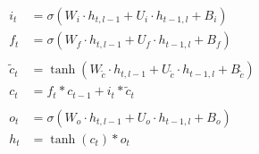 \documentclass{article}
\begin{document}
\begin{preview}

\begin{align*}
    i_t &= \sigma(W_i \cdot h_{t,l-1} + U_i \cdot h_{t-1,l} + B_i) \\
    f_t &= \sigma(W_f \cdot h_{t,l-1} + U_f \cdot h_{t-1,l} + B_f) \\
    & \\
    \tilde{c}_t &= \tanh(W_{\tilde{c}} \cdot h_{t,l-1} + U_{\tilde{c}} \cdot h_{t-1,l} + B_{\tilde{c}}) \\
    c_t &= f_t * c_{t-1} + i_t * \tilde{c}_t \\
    & \\
    o_t &= \sigma(W_o \cdot h_{t,l-1} + U_o \cdot h_{t-1,l} + B_o) \\
    h_t &= \tanh(c_t) * o_t
\end{align*}

\end{preview}
\end{document}
